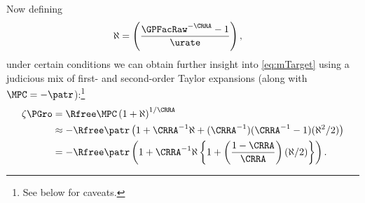 \documentclass{handout}
\begin{document}
Now defining
\begin{equation}\begin{gathered}\begin{aligned}
  \aleph & =  \left(\frac{\GPFacRaw^{-\CRRA} - 1}{\urate}\right),
\end{aligned}\end{gathered}\end{equation}
under certain conditions we can obtain further insight into \eqref{eq:mTarget} using a judicious mix of first- and second-order Taylor expansions (along with $\MPCU = -\patr$):\footnote{See below for caveats.}
\begin{equation}\begin{gathered}\begin{aligned}
  \label{eq:zetaExp}
  \zeta\PGro & =  \Rfree \MPCU \left(1+\aleph\right)^{1/\CRRA}
\\ & \approx  -\Rfree \patr \left(1+\CRRA^{-1}\aleph+(\CRRA^{-1})(\CRRA^{-1}-1)(\aleph^{2}/2)\right)
\\ & =  -\Rfree \patr \left(1+\CRRA^{-1}\aleph\left\{1+\left(\frac{1-\CRRA}{\CRRA}\right)(\aleph/2)\right\}\right) %
.
\end{aligned}\end{gathered}\end{equation}
\end{document}
